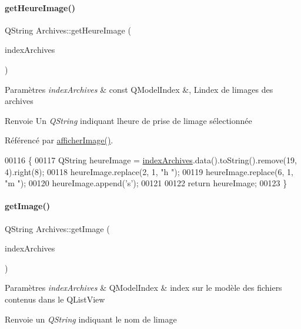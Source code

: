 \paragraph{\texorpdfstring{get\+Heure\+Image()}{getHeureImage()}}
{\footnotesize\ttfamily Q\+String Archives\+::get\+Heure\+Image (\begin{DoxyParamCaption}\item[{const Q\+Model\+Index \&}]{index\+Archives }\end{DoxyParamCaption})}


\begin{DoxyParams}{Paramètres}
{\em index\+Archives} & const Q\+Model\+Index \&, L\textquotesingle{}index de l\textquotesingle{}images des archives \\
\hline
\end{DoxyParams}
\begin{DoxyReturn}{Renvoie}
Un {\itshape Q\+String} indiquant l\textquotesingle{}heure de prise de l\textquotesingle{}image sélectionnée 
\end{DoxyReturn}


Référencé par \hyperlink{class_archives_a0e12a12774643d96831be4daba73976e}{afficher\+Image()}.


\begin{DoxyCode}
00116 \{
00117     QString heureImage = \hyperlink{class_archives_a31cba52f3979585ee5e2b9390d21322b}{indexArchives}.data().toString().remove(19, 4).right(8);
00118     heureImage.replace(2, 1, \textcolor{stringliteral}{"h "});
00119     heureImage.replace(6, 1, \textcolor{stringliteral}{"m "});
00120     heureImage.append(\textcolor{charliteral}{'s'});
00121 
00122     \textcolor{keywordflow}{return} heureImage;
00123 \}
\end{DoxyCode}
\mbox{\label{class_archives_a9e35a0ff2d5823819cd2a9f8019c7b33}} 
\paragraph{\texorpdfstring{get\+Image()}{getImage()}}
{\footnotesize\ttfamily Q\+String Archives\+::get\+Image (\begin{DoxyParamCaption}\item[{const Q\+Model\+Index \&}]{index\+Archives }\end{DoxyParamCaption})}


\begin{DoxyParams}{Paramètres}
{\em index\+Archives} & Q\+Model\+Index \& index sur le modèle des fichiers contenus dans le Q\+List\+View \\
\hline
\end{DoxyParams}
\begin{DoxyReturn}{Renvoie}
un {\itshape Q\+String} indiquant le nom de l\textquotesingle{}image 
\end{DoxyReturn}



